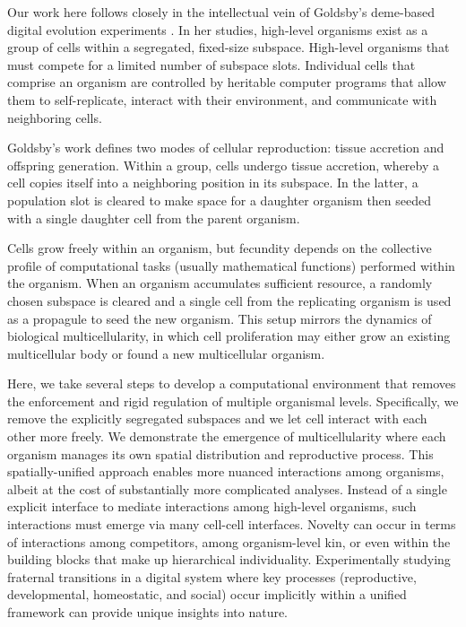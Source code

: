 Our work here follows closely in the intellectual vein of Goldsby's deme-based digital evolution experiments \citep{goldsby2012task, goldsby2014evolutionary}.
In her studies, high-level organisms exist as a group of cells within a segregated, fixed-size subspace.
High-level organisms that must compete for a limited number of subspace slots.
Individual cells that comprise an organism are controlled by heritable computer programs that allow them to self-replicate, interact with their environment, and communicate with neighboring cells.

Goldsby's work defines two modes of cellular reproduction: tissue accretion and offspring generation.
Within a group, cells undergo tissue accretion, whereby a cell copies itself into a neighboring position in its subspace.
In the latter, a population slot is cleared to make space for a daughter organism then seeded with a single daughter cell from the parent organism.

Cells grow freely within an organism, but fecundity depends on the collective profile of computational tasks (usually mathematical functions) performed within the organism.
When an organism accumulates sufficient resource, a randomly chosen subspace is cleared and a single cell from the replicating organism is used as a propagule to seed the new organism.
This setup mirrors the dynamics of biological multicellularity, in which cell proliferation may either grow an existing multicellular body or found a new multicellular organism.

Here, we take several steps to develop a computational environment that removes the enforcement and rigid regulation of multiple organismal levels.
Specifically, we remove the explicitly segregated subspaces and we let cell interact with each other more freely.
We demonstrate the emergence of multicellularity where each organism manages its own spatial distribution and reproductive process.
This spatially-unified approach enables more nuanced interactions among organisms, albeit at the cost of substantially more complicated analyses.
Instead of a single explicit interface to mediate interactions among high-level organisms, such interactions must emerge via many cell-cell interfaces.
Novelty can occur in terms of interactions among competitors, among organism-level kin, or even within the building blocks that make up hierarchical individuality.
Experimentally studying fraternal transitions in a digital system where key processes (reproductive, developmental, homeostatic, and social) occur implicitly within a unified framework can provide unique insights into nature.

